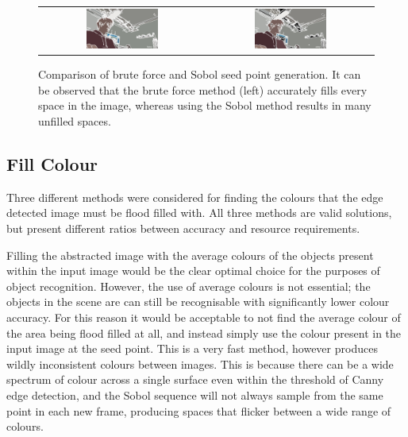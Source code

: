 \begin{figure}[H]
    \begin{center}
    \begin{tabular}{ c c }
        \includegraphics[width=0.45\textwidth]{Figures/Brute.jpg} &
        \includegraphics[width=0.45\textwidth]{Figures/Sobol.jpg}
    \end{tabular}
    \caption[Comparison of brute force and Sobol seed point generation]{Comparison of brute force and Sobol seed point generation. It can be observed that the brute force method (left) accurately fills every space in the image, whereas using the Sobol method results in many unfilled spaces.}
    \label{fig:BrutevsSobol}
    \end{center}
\end{figure}

\subsection{Fill Colour}

Three different methods were considered for finding the colours that the edge detected image must be flood filled with. All three methods are valid solutions, but present different ratios between accuracy and resource requirements.

Filling the abstracted image with the average colours of the objects present within the input image would be the clear optimal choice for the purposes of object recognition. However, the use of average colours is not essential; the objects in the scene are can still be recognisable with significantly lower colour accuracy. For this reason it would be acceptable to not find the average colour of the area being flood filled at all, and instead simply use the colour present in the input image at the seed point. This is a very fast method, however produces wildly inconsistent colours between images. This is because there can be a wide spectrum of colour across a single surface even within the threshold of Canny edge detection, and the Sobol sequence will not always sample from the same point in each new frame, producing spaces that flicker between a wide range of colours.

